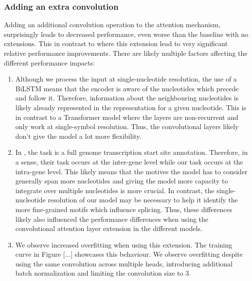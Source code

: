 \subsubsection{Adding an extra convolution}
Adding an additional convolution operation to the attention mechanism, surprisingly leads to decreased performance, even worse than the baseline with no extensions. This in contrast to \cite{ghentransformers} where this extension lead to very significant relative performance improvements. There are likely multiple factors affecting the different performance impacts:
\begin{enumerate}
	\item Although we process the input at single-nucleotide resolution, the use of a BiLSTM means that the encoder is aware of the nucleotides which precede and follow it. Therefore, information about the neighbouring nucleotides is likely already represented in the representation for a given nucleotide. This is in contrast to a Transformer model where the layers are non-recurrent and only work at single-symbol resolution. Thus, the convolutional layers likely don't give the model a lot more flexibility.
	\item In \cite{ghentransformers}, the task is a full genome transcription start site annotation. Therefore, in a sense, their task occurs at the inter-gene level while our task occurs at the intra-gene level. This likely means that the motives the model has to consider generally span more nucleotides and giving the model more capacity to integrate over multiple nucleotides is more crucial. In contrast, the single-nucleotide resolution of our model may be necessary to help it identify the more fine-grained motifs which influence splicing. Thus, these differences likely also influenced the performance differences when using the convolutional attention layer extension in the different models.
	\item We observe increased overfitting when using this extension. The training curve in Figure [...] %
	showcases this behaviour. We observe overfitting despite using the same convolution across multiple heads, introducing additional batch normalization and limiting the convolution size to 3. 
\end{enumerate}


